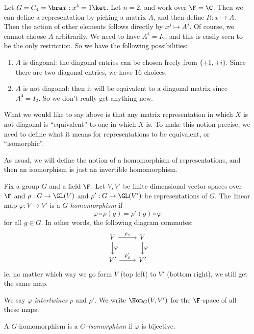 \documentclass[a4paper]{article}
\begin{document}
\begin{eg}
  Let $G = C_4 = \bra x: x^4 = 1\ket$. Let $n = 2$, and work over $\F = \C$. Then we can define a representation by picking a matrix $A$, and then define $R: x \mapsto A$. Then the action of other elements follows directly by $x^j \mapsto A^j$. Of course, we cannot choose $A$ arbitrarily. We need to have $A^4 = I_2$, and this is easily seen to be the only restriction. So we have the following possibilities:
  \begin{enumerate}
    \item $A$ is diagonal: the diagonal entries can be chosen freely from $\{\pm 1, \pm i\}$. Since there are two diagonal entries, we have $16$ choices.
    \item $A$ is not diagonal: then it will be equivalent to a diagonal matrix since $A^4 = I_2$. So we don't really get anything new.
  \end{enumerate}
\end{eg}
What we would like to say above is that any matrix representation in which $X$ is not diagonal is ``equivalent'' to one in which $X$ is. To make this notion precise, we need to define what it means for representations to be equivalent, or ``isomorphic''.

As usual, we will define the notion of a homomorphism of representations, and then an isomorphism is just an invertible homomorphism.

\begin{defi}
  Fix a group $G$ and a field $\F$. Let $V, V'$ be finite-dimensional vector spaces over $\F$ and $\rho: G \to \GL(V)$ and $\rho': G \to \GL(V')$ be representations of $G$. The linear map $\varphi: V \to V'$ is a \emph{$G$-homomorphism} if
  \[
    \varphi \circ \rho(g) = \rho'(g) \circ \varphi\tag{$*$}
  \]
  for all $g \in G$. In other words, the following diagram commutes:
  \[
    \begin{tikzcd}
      V \ar[r, "\rho_g"] \ar[d, "\varphi"] & V \ar[d, "\varphi"]\\
      V' \ar[r, "\rho_g'"] & V'
    \end{tikzcd}
  \]
  ie. no matter which way we go form $V$ (top left) to $V'$ (bottom right), we still get the same map.

  We say $\varphi$ \emph{intertwines} $\rho$ and $\rho'$. We write $\Hom_G(V, V')$ for the $\F$-space of all these maps.
\end{defi}

\begin{defi}[$G$-isomorphism]
  A $G$-homomorphism is a \emph{$G$-isomorphism} if $\varphi$ is bijective.
\end{defi}
\end{document}
